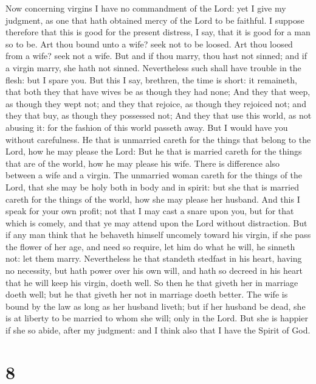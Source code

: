  Now concerning virgins I have no commandment of the Lord:
yet I give my judgment, as one that hath obtained mercy of the Lord to
be faithful.  I suppose therefore that this is good for the
present distress, I say, that it is good for a man so to be.
 Art thou bound unto a wife? seek not to be loosed. Art
thou loosed from a wife? seek not a wife.  But and if thou
marry, thou hast not sinned; and if a virgin marry, she hath not sinned.
Nevertheless such shall have trouble in the flesh: but I spare you.
 But this I say, brethren, the time is short: it remaineth,
that both they that have wives be as though they had none; 
And they that weep, as though they wept not; and they that rejoice, as
though they rejoiced not; and they that buy, as though they possessed
not;  And they that use this world, as not abusing it: for
the fashion of this world passeth away.  But I would have
you without carefulness. He that is unmarried careth for the things that
belong to the Lord, how he may please the Lord:  But he
that is married careth for the things that are of the world, how he may
please his wife.  There is difference also between a wife
and a virgin. The unmarried woman careth for the things of the Lord,
that she may be holy both in body and in spirit: but she that is married
careth for the things of the world, how she may please her husband.
 And this I speak for your own profit; not that I may cast
a snare upon you, but for that which is comely, and that ye may attend
upon the Lord without distraction.  But if any man think
that he behaveth himself uncomely toward his virgin, if she pass the
flower of her age, and need so require, let him do what he will, he
sinneth not: let them marry.  Nevertheless he that standeth
stedfast in his heart, having no necessity, but hath power over his own
will, and hath so decreed in his heart that he will keep his virgin,
doeth well.  So then he that giveth her in marriage doeth
well; but he that giveth her not in marriage doeth better. 
The wife is bound by the law as long as her husband liveth; but if her
husband be dead, she is at liberty to be married to whom she will; only
in the Lord.  But she is happier if she so abide, after my
judgment: and I think also that I have the Spirit of God.

\hypertarget{section-7}{%
\section{8}\label{section-7}}

